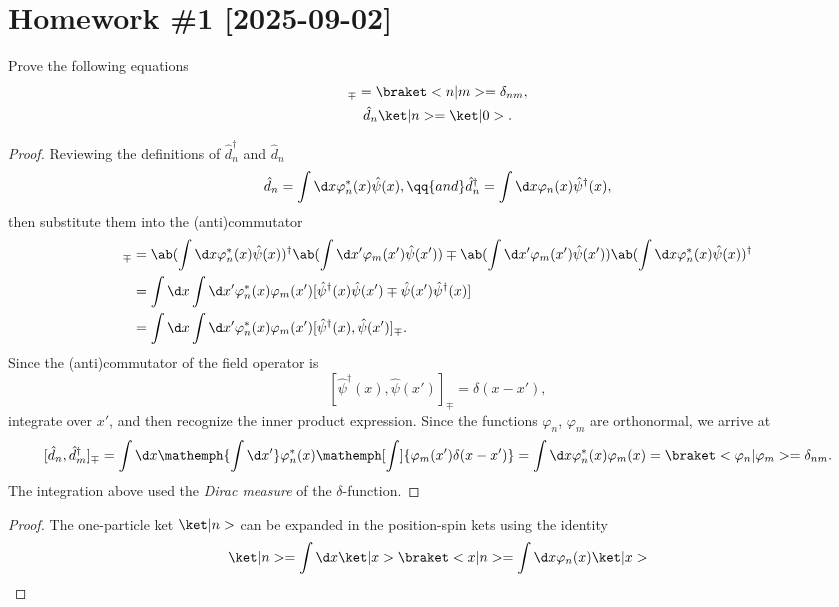 
\section*{Homework \#1 [2025-09-02]}

\begin{problem}
  Prove the following equations
  \begin{gather*}
    [\hat d_n, \hat d_m^\dagger]_{\mp} = \braket<n|m> = \delta_{nm},\\
    \hat d_n\ket|n> = \ket|0>.
  \end{gather*}
\end{problem}
\begin{solution}
\begin{proof}
  Reviewing the definitions of $\hat d_n^\dagger$ and $\hat d_n$
  \[
    \hat d_n = \int \d x \varphi_n^*(x) \hat\psi(x),\qq{and}
    \hat d_n^\dagger = \int \d x \varphi_n(x) \hat\psi^\dagger(x),
  \]
  then substitute them into the (anti)commutator
  \begin{align*}
    [\hat d_n, \hat d_m^\dagger]_{\mp} & =
    \ab(\int \d x \varphi_n^*(x) \hat\psi(x))^\dagger
    \ab(\int \d x' \varphi_m(x') \hat\psi(x')) \mp
    \ab(\int \d x' \varphi_m(x') \hat\psi(x'))
    \ab(\int \d x \varphi_n^*(x) \hat\psi(x))^\dagger\\
& = \int \d x \int \d x' \varphi_n^*(x) \varphi_m(x')
    [\hat\psi^\dagger(x) \hat\psi(x') \mp \hat\psi(x') \hat\psi^\dagger(x)]\\
& = \int \d x \int \d x' \varphi_n^*(x) \varphi_m(x')
    [\hat\psi^\dagger(x), \hat\psi(x')]_\mp.
  \end{align*}
  Since the (anti)commutator of the field operator is
  \[
    [\hat\psi^\dagger(x), \hat\psi(x')]_\mp = \delta(x - x'),
  \]
  integrate over $x'$, and then recognize the inner product expression.
  Since the functions $\varphi_n$, $\varphi_m$ are orthonormal, we arrive at
  \[
    [\hat d_n, \hat d_m^\dagger]_{\mp}
  = \int \d x \mathemph{\int \d x'} \varphi_n^*(x)
              \mathemph[\int]{\varphi_m(x') \delta(x - x')}
  = \int \d x \varphi_n^*(x) \varphi_m(x)
  = \braket<\varphi_n|\varphi_m> = \delta_{nm}.
  \]
  The integration above used the \emph{Dirac measure} of the $\delta$-function.
\end{proof}
\begin{proof}
  The one-particle ket $\ket|n>$ can be expanded in the position-spin kets
  using the identity
  \[
    \ket|n> = \int \d x \ket|x> \braket<x|n> = \int \d x \varphi_n(x) \ket|x>
\]
\end{proof}
\end{solution}

